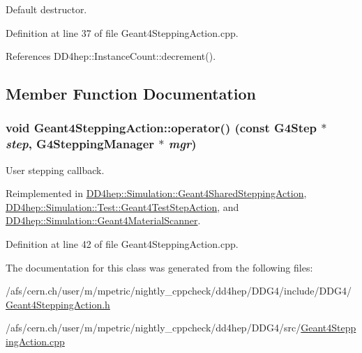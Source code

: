 Default destructor. 

Definition at line 37 of file Geant4SteppingAction.cpp.

References DD4hep::InstanceCount::decrement().

\subsection{Member Function Documentation}
\hypertarget{class_d_d4hep_1_1_simulation_1_1_geant4_stepping_action_ab6b61f6eaed6d06ddb3a7ed319258317}{
\subsubsection[{operator()}]{\setlength{\rightskip}{0pt plus 5cm}void Geant4SteppingAction::operator() (const G4Step $\ast$ {\em step}, \/  G4SteppingManager $\ast$ {\em mgr})}}
\label{class_d_d4hep_1_1_simulation_1_1_geant4_stepping_action_ab6b61f6eaed6d06ddb3a7ed319258317}


User stepping callback. 

Reimplemented in \hyperlink{class_d_d4hep_1_1_simulation_1_1_geant4_shared_stepping_action_a5128c3fa4f478cda734a35a09ee86ae0}{DD4hep::Simulation::Geant4SharedSteppingAction}, \hyperlink{class_d_d4hep_1_1_simulation_1_1_test_1_1_geant4_test_step_action_a19d915e8a634552f25a839a92843258a}{DD4hep::Simulation::Test::Geant4TestStepAction}, and \hyperlink{class_d_d4hep_1_1_simulation_1_1_geant4_material_scanner_abd897a6b73a1855f674962d0e6126c17}{DD4hep::Simulation::Geant4MaterialScanner}.

Definition at line 42 of file Geant4SteppingAction.cpp.

The documentation for this class was generated from the following files:\begin{DoxyCompactItemize}
\item 
/afs/cern.ch/user/m/mpetric/nightly\_\-cppcheck/dd4hep/DDG4/include/DDG4/\hyperlink{_geant4_stepping_action_8h}{Geant4SteppingAction.h}\item 
/afs/cern.ch/user/m/mpetric/nightly\_\-cppcheck/dd4hep/DDG4/src/\hyperlink{_geant4_stepping_action_8cpp}{Geant4SteppingAction.cpp}\end{DoxyCompactItemize}
